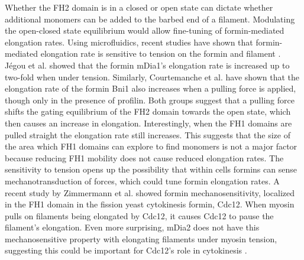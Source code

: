 Whether the FH2 domain is in a closed or open state can dictate whether additional monomers can be added to the barbed end of a filament. Modulating the open-closed state equilibrium would allow fine-tuning of formin-mediated elongation rates. Using microfluidics, recent studies have shown that formin-mediated elongation rate is sensitive to tension on the formin and filament \citep{courtemanche_tension_2013,jegou_formin_2013}. Jégou et al. showed that the formin mDia1's elongation rate is increased up to two-fold when under tension. Similarly, Courtemanche et al. have shown that the elongation rate of the formin Bni1 also increases when a pulling force is applied, though only in the presence of profilin. Both groups suggest that a pulling force shifts the gating equilibrium of the FH2 domain towards the open state, which then causes an increase in elongation. Interestingly, when the FH1 domains are pulled straight the elongation rate still increases. This suggests that the size of the area which FH1 domains can explore to find monomers is not a major factor because reducing FH1 mobility does not cause reduced elongation rates.  The sensitivity to tension opens up the possibility that within cells formins can sense mechanotransduction of forces, which could tune formin elongation rates. A recent study by Zimmermann et al. showed formin mechanosensitivity, localized in the FH1 domain in the fission yeast cytokinesis formin, Cdc12. When myosin pulls on filaments being elongated by Cdc12, it causes Cdc12 to pause the filament's elongation. Even more surprising, mDia2 does not have this mechanosensitive property with elongating filaments under myosin tension, suggesting this could be important for Cdc12's role in cytokinesis \citep{zimmermann_mechanoregulated_2017}. 

